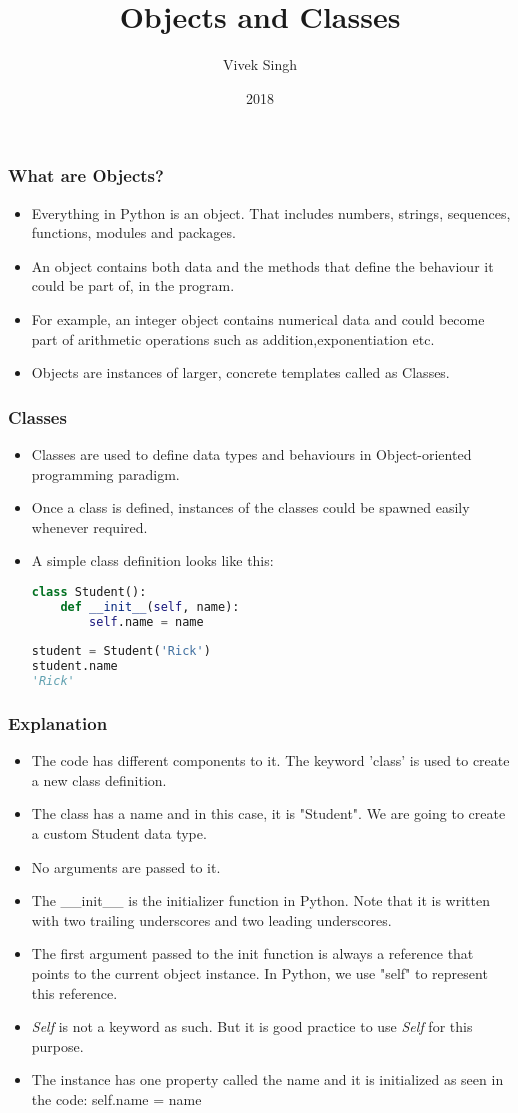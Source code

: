 \documentclass{beamer}
\title{Objects and Classes}
\author{Vivek Singh}
\institute{Information Systems Decision Sciences (ISDS)\\
MUMA College of Business\\
University of South Florida \\
Tampa, Florida}
\date{2018}
\begin{document}
\frame{\titlepage}

\begin{frame}
\frametitle{What are Objects?}
\begin{itemize}
\item Everything in Python is an object. That includes numbers, strings, sequences, functions, modules and packages.
\item An object contains both data and the methods that define the behaviour it could be part of, in the program.
\item For example, an integer object contains numerical data and could become part of arithmetic operations such as addition,exponentiation etc.
\item Objects are instances of larger, concrete templates called as Classes. 
\end{itemize}
\end{frame}

\begin{frame}[fragile]
\frametitle{Classes}
\begin{itemize}
\item Classes are used to define data types and behaviours in Object-oriented programming paradigm.
\item Once a class is defined, instances of the classes could be spawned easily whenever required.
\item A simple class definition looks like this:

\begin{lstlisting}[language=Python]
class Student():
	def __init__(self, name):
		self.name = name
		
student = Student('Rick')
student.name
'Rick'
\end{lstlisting}
\end{itemize}
\end{frame}

\begin{frame}
\frametitle{Explanation}
\begin{itemize}
\item The code has different components to it. The keyword 'class' is used to create a new class definition.
\item The class has a name and in this case, it is "Student". We are going to create a custom Student data type.
\item No arguments are passed to it.
\item The \_\_init\_\_ is the initializer function in Python. Note that it is written with two trailing underscores and two leading underscores.
\item The first argument passed to the init function is always a reference that points to the current object instance. In Python, we use "self" to represent this reference.
\item \textit{Self} is not a keyword as such. But it is good practice to use \textit{Self} for this purpose.
\item The instance has one property called the name and it is initialized as seen in the code:
self.name = name
\end{itemize}
\end{frame}
\end{document}
